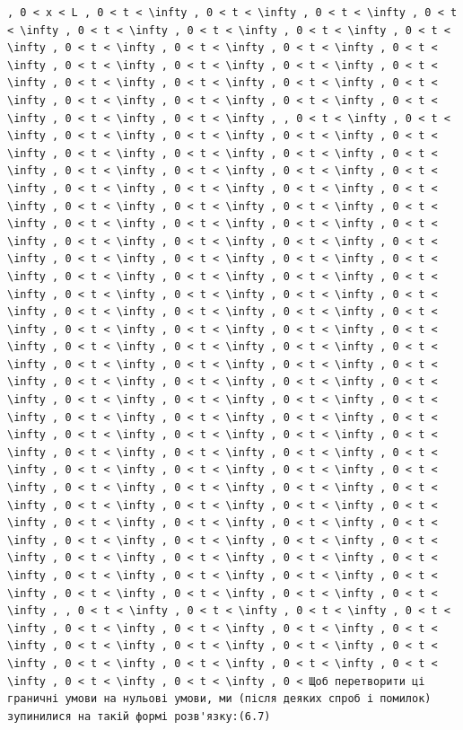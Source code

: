 \documentclass[
  ukrainian,
]{article}
\begin{document}
\begin{verbatim}
, 0 < x < L , 0 < t < \infty , 0 < t < \infty , 0 < t < \infty , 0 < t < \infty , 0 < t < \infty , 0 < t < \infty , 0 < t < \infty , 0 < t < \infty , 0 < t < \infty , 0 < t < \infty , 0 < t < \infty , 0 < t < \infty , 0 < t < \infty , 0 < t < \infty , 0 < t < \infty , 0 < t < \infty , 0 < t < \infty , 0 < t < \infty , 0 < t < \infty , 0 < t < \infty , 0 < t < \infty , 0 < t < \infty , 0 < t < \infty , 0 < t < \infty , 0 < t < \infty , 0 < t < \infty , , 0 < t < \infty , 0 < t < \infty , 0 < t < \infty , 0 < t < \infty , 0 < t < \infty , 0 < t < \infty , 0 < t < \infty , 0 < t < \infty , 0 < t < \infty , 0 < t < \infty , 0 < t < \infty , 0 < t < \infty , 0 < t < \infty , 0 < t < \infty , 0 < t < \infty , 0 < t < \infty , 0 < t < \infty , 0 < t < \infty , 0 < t < \infty , 0 < t < \infty , 0 < t < \infty , 0 < t < \infty , 0 < t < \infty , 0 < t < \infty , 0 < t < \infty , 0 < t < \infty , 0 < t < \infty , 0 < t < \infty , 0 < t < \infty , 0 < t < \infty , 0 < t < \infty , 0 < t < \infty , 0 < t < \infty , 0 < t < \infty , 0 < t < \infty , 0 < t < \infty , 0 < t < \infty , 0 < t < \infty , 0 < t < \infty , 0 < t < \infty , 0 < t < \infty , 0 < t < \infty , 0 < t < \infty , 0 < t < \infty , 0 < t < \infty , 0 < t < \infty , 0 < t < \infty , 0 < t < \infty , 0 < t < \infty , 0 < t < \infty , 0 < t < \infty , 0 < t < \infty , 0 < t < \infty , 0 < t < \infty , 0 < t < \infty , 0 < t < \infty , 0 < t < \infty , 0 < t < \infty , 0 < t < \infty , 0 < t < \infty , 0 < t < \infty , 0 < t < \infty , 0 < t < \infty , 0 < t < \infty , 0 < t < \infty , 0 < t < \infty , 0 < t < \infty , 0 < t < \infty , 0 < t < \infty , 0 < t < \infty , 0 < t < \infty , 0 < t < \infty , 0 < t < \infty , 0 < t < \infty , 0 < t < \infty , 0 < t < \infty , 0 < t < \infty , 0 < t < \infty , 0 < t < \infty , 0 < t < \infty , 0 < t < \infty , 0 < t < \infty , 0 < t < \infty , 0 < t < \infty , 0 < t < \infty , 0 < t < \infty , 0 < t < \infty , 0 < t < \infty , 0 < t < \infty , 0 < t < \infty , 0 < t < \infty , 0 < t < \infty , 0 < t < \infty , 0 < t < \infty , 0 < t < \infty , 0 < t < \infty , 0 < t < \infty , 0 < t < \infty , 0 < t < \infty , 0 < t < \infty , 0 < t < \infty , 0 < t < \infty , 0 < t < \infty , 0 < t < \infty , 0 < t < \infty , 0 < t < \infty , 0 < t < \infty , 0 < t < \infty , 0 < t < \infty , 0 < t < \infty , , 0 < t < \infty , 0 < t < \infty , 0 < t < \infty , 0 < t < \infty , 0 < t < \infty , 0 < t < \infty , 0 < t < \infty , 0 < t < \infty , 0 < t < \infty , 0 < t < \infty , 0 < t < \infty , 0 < t < \infty , 0 < t < \infty , 0 < t < \infty , 0 < t < \infty , 0 < t < \infty , 0 < t < \infty , 0 < t < \infty , 0 < Щоб перетворити ці граничні умови на нульові умови, ми (після деяких спроб і помилок) зупинилися на такій формі розв'язку:(6.7)
\end{verbatim}
\end{document}
